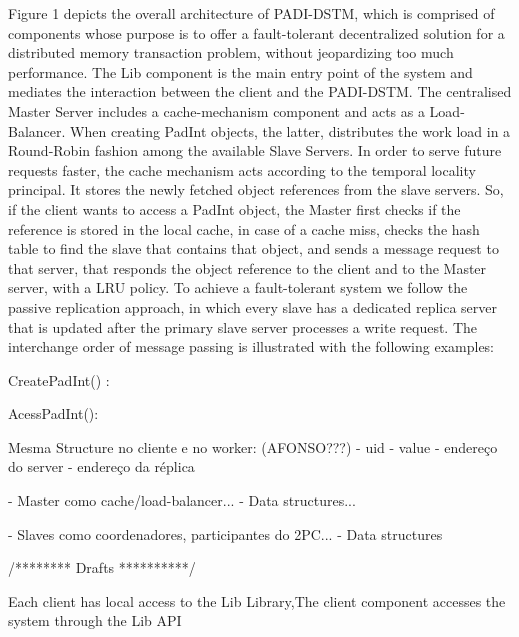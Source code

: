 \documentclass[times, 10pt,twocolumn]{article}
\begin{document}

Figure 1 depicts the overall architecture of PADI-DSTM, which is comprised of components whose purpose is to offer a fault-tolerant decentralized solution for a distributed memory transaction problem, without jeopardizing too much performance. The Lib component is the main entry point of the system and mediates the interaction between the client and the PADI-DSTM. The centralised Master Server includes a cache-mechanism component and acts as a Load-Balancer. When creating PadInt objects, the latter, distributes the work load in a Round-Robin fashion among the available Slave Servers. In order to serve future requests faster, the cache mechanism acts according to the temporal locality principal. It stores the newly fetched object references from the slave servers. So, if the client wants to access a PadInt object, the Master first checks if the reference is stored in the local cache, in case of a cache miss, checks the hash table to find the slave that contains that object, and sends a message request to that server, that responds the object reference to the client and to the Master server, with a LRU policy. To achieve a fault-tolerant system we follow the passive replication approach, in which every slave has a dedicated replica server that is updated after the primary slave server processes a write request. The interchange order of message passing is illustrated with the following examples:



CreatePadInt() :

AcessPadInt():

Mesma Structure no cliente e no worker: (AFONSO???)
 - uid
 - value
 - endereço do server
 - endereço da réplica
 

 - Master como cache/load-balancer...
 - Data structures...
 
 - Slaves como coordenadores, participantes do 2PC...
 - Data structures
 








/******** Drafts **********/


Each client has local access to the Lib Library,The client component accesses the system through the Lib API
\end{document}
